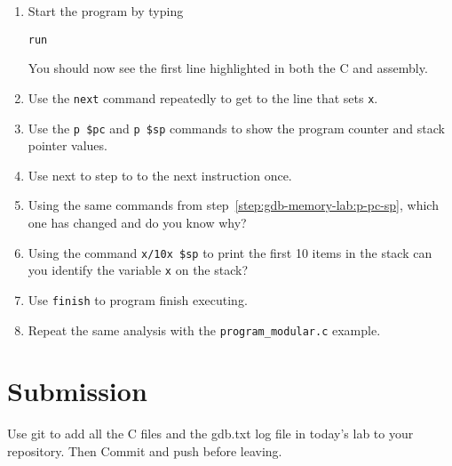 \begin{enumerate}
\item
  Start the program by typing
\begin{verbatim}
run
\end{verbatim}
You should now see the first line highlighted in both the C and assembly. 

\item
  Use the \texttt{next} command repeatedly to get to the line that sets \texttt{x}.

\item \label{step:gdb-memory-lab:p-pc-sp}
  Use the \texttt{p \$pc} and \texttt{p \$sp} commands to show the program counter and stack pointer values.

\item
  Use next to step to to the next instruction once.

\item
  Using the same commands from step~\ref{step:gdb-memory-lab:p-pc-sp}, which one has changed and do you know why?

\item
  Using the command \texttt{x/10x \$sp} to print the first 10 items in the stack can you identify the variable \texttt{x} on the stack?

\item
  Use \texttt{finish} to program finish executing.  

\item
  Repeat the same analysis with the \texttt{program\_modular.c} example. 
  
\end{enumerate}


\section{Submission}

Use git to add all the C files and the gdb.txt log file in today's lab to your repository.
Then Commit and push before leaving.

